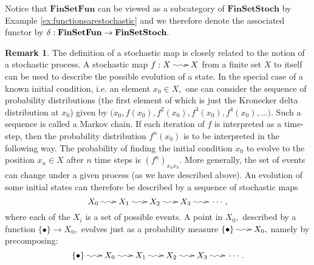 \documentclass[12pt]{article}
\makeatletter
\theoremstyle{theorem}
\theoremstyle{definition}
\newtheorem{remark}[equation]{Remark}
\numberwithin{equation}{section}
\newcommand{\be}{\begin{equation}}
\newcommand{\ee}{\end{equation}}
\newcommand{\br}{\begin{remark}}
\newcommand{\er}{\end{remark}}
\newcommand{\<}{\langle}
\renewcommand{\>}{\rangle}
\newcommand{\FinSetFun}{\mathbf{FinSetFun}}
\newcommand{\FinSetStoch}{\mathbf{FinSetStoch}}
\newcommand{\stoch}{\;\xy0;/r.25pc/:\ar@{~>}(3,0);(-3,0);\endxy\;}
\makeatother
\begin{document}
Notice that $\FinSetFun$ can be viewed as a subcategory of $\FinSetStoch$ by 
Example \ref{ex:functionsarestochastic} and we therefore
denote the associated functor by $\de:\FinSetFun\to\FinSetStoch.$ 

\br
The definition of a stochastic map is closely related to the notion
of a stochastic process. 
A stochastic map $f:X\stoch X$ from a finite set $X$
to itself can be used to describe the possible evolution
of a state. In the special case of a known
initial condition, i.e. an element $x_0\in X,$
one can consider the sequence of probability distributions 
(the first element of which is just the Kronecker delta
distribution at $x_{0}$) given by 
$\big(x_0, f(x_0),f^2(x_0),f^3(x_0), f^4(x_0), \dots\big).$ 
Such a sequence is called a Markov chain.
If each iteration of $f$ is interpreted as a time-step, 
then the probability distribution $f^n(x_0)$ is to be interpreted
in the following way. The probability of finding the initial condition
$x_0$ to evolve to the position $x_n\in X$ after $n$ time steps
is $(f^n)_{x_n x_0}.$ 
More generally, the
set of events can change under a given process (as we have
described above). An evolution of some initial states
can therefore be described by a sequence of stochastic maps
\be
X_0\stoch X_1\stoch X_2\stoch X_3\stoch\cdots,
\ee
where each of the $X_{i}$ is a set of possible events. 
A point in $X_{0},$ described by a function $\{\bullet\}\to X_{0},$ 
evolves just as a probability measure $\{\bullet\}\stoch X_{0},$
namely by precomposing:
\be
\{\bullet\}\stoch X_0\stoch X_1\stoch X_2\stoch X_3\stoch\cdots. 
\ee
\er
\end{document}
